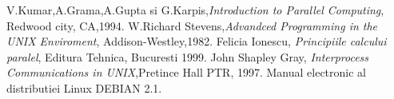 \begin{thebibliography}{10}
 V.Kumar,A.Grama,A.Gupta si G.Karpis,{\it Introduction to
Parallel Computing}, Redwood city, CA,1994.
 W.Richard Stevens,{\it Advandced Programming in the UNIX
Enviroment}, Addison-Westley,1982.
 Felicia Ionescu, {\it Principiile calcului paralel},
Editura Tehnica, Bucuresti 1999.
 John Shapley Gray, {\it Interprocess Communications in UNIX},Pretince Hall PTR,
1997.
 Manual electronic al distributiei Linux DEBIAN 2.1.
\end{thebibliography}